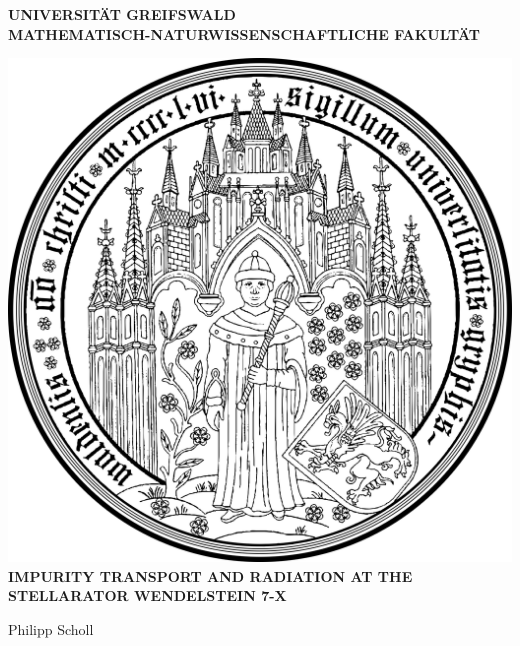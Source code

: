 \documentclass[12pt]{report}
\begin{document}
\begin{titlepage}
    \centering%

    \MakeUppercase{%
        \textbf{%
            Universität Greifswald\\[.3cm]%
        }%
    }%
    \MakeUppercase{%
        \textbf{%
            Mathematisch-Naturwissenschaftliche Fakultät\\[1.5cm]%
        }%
    }%

    \includegraphics[width=.45\textwidth]{siegel}\\[2cm]%

    \MakeUppercase{%
        \Large%
        \textbf{%
            Impurity Transport and Radiation at the Stellarator Wendelstein 7-X%
        }%
    }%


    \vfill%
    {\Large%
        Philipp Scholl%
    }%

\end{titlepage}
\end{document}

